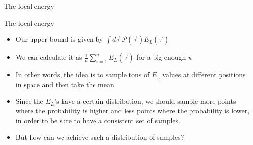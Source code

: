 \documentclass[10pt, compress, usetitleprogressbar, protectframetitle]{beamer}
\begin{document}
\begin{frame}{The local energy}
	
	
	
	
	
	

\end{frame}

\begin{frame}{The local energy}
	
	
	\begin{itemize}[<+->]
		\item Our upper bound is given by $\int d\vec{\tau}\,\mathcal{P}(\vec{\tau})E_L(\vec{\tau})$
		\item We can calculate it as $\frac{1}{n}\sum_{i=1}^{n}E_L(\vec{\tau})$ for a big enough $n$
		\item In other words, the idea is to sample tons of $E_L$ values at different positions in space and then take the mean
		\item Since the $E_L$'s have a certain distribution, we should sample more points where the probability is higher and less points where the probability is lower, in order to be sure to have a consistent set of samples.
		\item \alert{But how can we achieve such a distribution of samples?}
	\end{itemize}
	
\end{frame}
\end{document}
